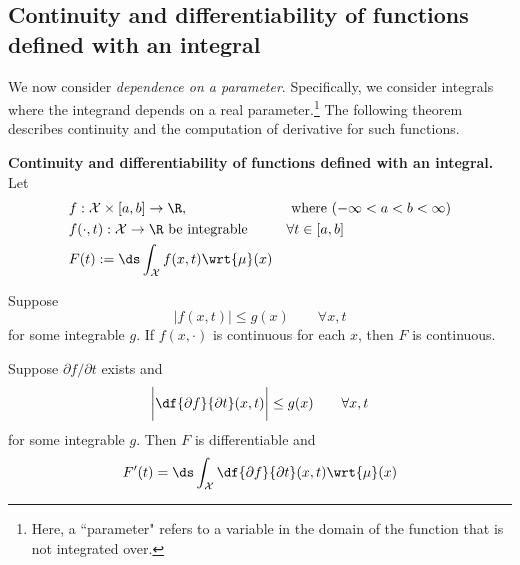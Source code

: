 \documentclass{article} %
\newcommand{\dmu}{\wrt{\mu}}
\begin{document}
\subsection{Continuity and differentiability of functions defined with an integral}

We now consider \textit{dependence on a parameter}.  Specifically, we consider integrals where the integrand depends on a real parameter.\footnote{Here, a ``parameter" refers to a variable in the domain of the function that is not integrated over.}  The following theorem describes continuity and the computation of derivative for such functions. 

\begin{theorem}{\textbf{Continuity and differentiability of functions defined with an integral.}}
Let 
\begin{align*}
& f : \mathcal{X} \times [a,b] \to \R, && \text{ where } (-\infty < a < b < \infty) \\
& f(\cdot, t) : \mathcal{X} \to \R \text{ be integrable} && \forall t \in [a,b] \\
&F(t) := \ds\int_{\mathcal{X}} f(x,t) \dmu(x)  
\end{align*}
\begin{alphabate}
\item Suppose
\[ |f(x,t)| \leq g(x) \quad \quad \forall x,t \]
for some integrable $g$.   If $f(x,\cdot)$ is continuous for each $x$, then $F$ is continuous.
\item Suppose $\partial f / \partial t$ exists and 
\[ \bigg|\df{\partial f}{\partial t}(x,t)\bigg| \leq g(x) \quad \quad \forall x,t \]
for some integrable $g$.  Then $F$ is differentiable and 
\[ F'(t) = \ds\int_{\mathcal{X}} \df{\partial f}{\partial t}(x,t) \dmu(x) \]
\end{alphabate}
\label{thm:continuity_and_differentiability_of_functions_defined_with_an_integral}
\end{theorem}
	
\end{document}
